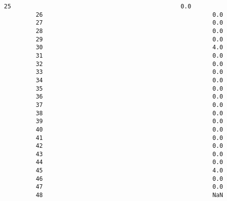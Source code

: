 \documentclass[11pt]{article}
\begin{document}
\begin{Verbatim}[commandchars=\\\{\}]
         25                                                0.0                                     
         26                                                0.0                                     
         27                                                0.0                                     
         28                                                0.0                                     
         29                                                0.0                                     
         30                                                4.0                                     
         31                                                0.0                                     
         32                                                0.0                                     
         33                                                0.0                                     
         34                                                0.0                                     
         35                                                0.0                                     
         36                                                0.0                                     
         37                                                0.0                                     
         38                                                0.0                                     
         39                                                0.0                                     
         40                                                0.0                                     
         41                                                0.0                                     
         42                                                0.0                                     
         43                                                0.0                                     
         44                                                0.0                                     
         45                                                4.0                                     
         46                                                0.0                                     
         47                                                0.0                                     
         48                                                NaN                                     
         

\end{Verbatim}
\end{document}
